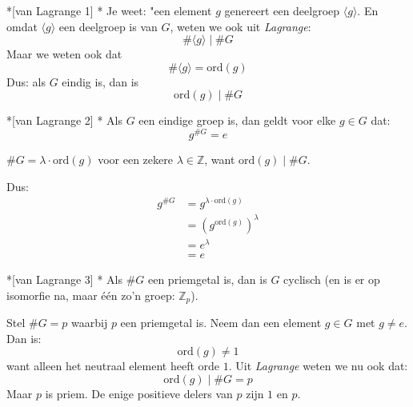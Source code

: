 \begin{nicecorollary}*[van Lagrange 1]\label{gevolg:H3_gevolg_lagrange_1}
    \nextpart[]*
    Je weet: "een element $g$ genereert een deelgroep $\langle g \rangle$. En omdat $\langle g \rangle$ een deelgroep is van $G$, weten we ook uit \emph{Lagrange}:
    \begin{equation*}
        \#\langle g \rangle \mid \#G
    \end{equation*}
    Maar we weten ook dat
    \begin{equation*}
        \#\langle g \rangle = \text{ord}(g)
    \end{equation*}
    Dus: als $G$ eindig is, dan is
    \begin{equation*}
        \text{ord}(g)\mid\#G
    \end{equation*}
\end{nicecorollary}

\begin{nicecorollary}*[van Lagrange 2]\label{gevolg:lagrange_2_gevolg}
    \nextpart[]*
    Als $G$ een eindige groep is, dan geldt voor elke $g \in G$ dat:
    \begin{equation*}
        g^{\#G} = e
    \end{equation*}
\end{nicecorollary}
\textbf{} $\#G = \lambda \cdot \text{ord}(g)$ voor een zekere $\lambda \in \mathbb{Z}$, want $\text{ord}(g)\mid\#G$.

Dus:
\begin{equation*}
    \begin{aligned}
        g^{\#G} &= g^{\lambda \cdot \text{ord}(g)} \\
                &= \left(g^{\text{ord}(g)}\right)^\lambda \\
                &= e^\lambda \\
                &= e
    \end{aligned}
\end{equation*}

\begin{nicecorollary}*[van Lagrange 3]
    \nextpart[]*
    Als $\#G$ een priemgetal is, dan is $G$ cyclisch (en is er op isomorfie na, maar één zo'n groep: $\mathbb{Z}_p$).
\end{nicecorollary}

\textbf{} Stel $\#G = p$ waarbij $p$ een priemgetal is. Neem dan een element $g \in G$ met $g \neq e$. Dan is:
\begin{equation*}
    \text{ord}(g) \neq 1
\end{equation*}
want alleen het neutraal element heeft orde $1$. Uit \emph{Lagrange} weten we nu ook dat:
\begin{equation*}
    \text{ord}(g) \mid \#G = p
\end{equation*}
Maar $p$ is priem. De enige positieve delers van $p$ zijn $1$ en $p$.

